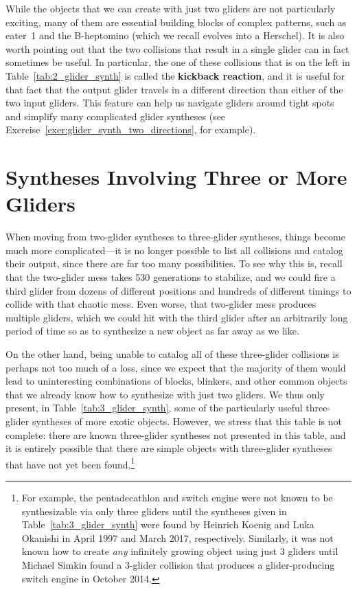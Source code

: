 While the objects that we can create with just two gliders are not particularly exciting, many of them are essential building blocks of complex patterns, such as eater~1 and the B-heptomino (which we recall evolves into a Herschel). It is also worth pointing out that the two collisions that result in a single glider can in fact sometimes be useful. In particular, the one of these collisions that is on the left in Table~\ref{tab:2_glider_synth} is called the \textbf{kickback reaction}, and it is useful for that fact that the output glider travels in a different direction than either of the two input gliders. This feature can help us navigate gliders around tight spots and simplify many complicated glider syntheses (see Exercise~\ref{exer:glider_synth_two_directions}, for example).


\section{Syntheses Involving Three or More Gliders}\label{sec:3glidersynth}

When moving from two-glider syntheses to three-glider syntheses, things become much more complicated---it is no longer possible to list all collisions and catalog their output, since there are far too many possibilities. To see why this is, recall that the two-glider mess takes 530 generations to stabilize, and we could fire a third glider from dozens of different positions and hundreds of different timings to collide with that chaotic mess. Even worse, that two-glider mess produces multiple gliders, which we could hit with the third glider after an arbitrarily long period of time so as to synthesize a new object as far away as we like.

On the other hand, being unable to catalog all of these three-glider collisions is perhaps not too much of a loss, since we expect that the majority of them would lead to uninteresting combinations of blocks, blinkers, and other common objects that we already know how to synthesize with just two gliders. We thus only present, in Table~\ref{tab:3_glider_synth}, some of the particularly useful three-glider syntheses of more exotic objects. However, we stress that this table is not complete: there are known three-glider syntheses not presented in this table, and it is entirely possible that there are simple objects with three-glider syntheses that have not yet been found.\footnote{For example, the pentadecathlon and switch engine were not known to be synthesizable via only three gliders until the syntheses given in Table~\ref{tab:3_glider_synth} were found by Heinrich Koenig and Luka Okanishi in April 1997 and March 2017, respectively. Similarly, it was not known how to create \emph{any} infinitely growing object using just $3$ gliders until Michael Simkin found a $3$-glider collision that produces a glider-producing switch engine in October 2014.}

